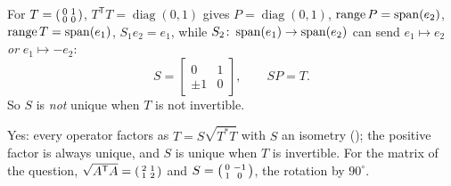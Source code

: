 \documentclass[10pt]{scrartcl}
\begin{document}
\begin{example*}
  For $T=\begin{psmallmatrix}0&1\\0&0\end{psmallmatrix}$, $T^{\mathsf T}T=\operatorname{diag}(0,1)$ gives $P=\operatorname{diag}(0,1)$, $\operatorname{range} P=\operatorname{span}(e_2)$, $\operatorname{range} T=\operatorname{span}(e_1)$, $S_1e_2=e_1$, while $S_2\colon\operatorname{span}(e_1)\to\operatorname{span}(e_2)$ can send $e_1\mapsto e_2$ \emph{or} $e_1\mapsto -e_2$:
  \[
    S=\begin{bmatrix}0&1\\\pm1&0\end{bmatrix}, \qquad SP=T.
  \]
  So $S$ is \emph{not} unique when $T$ is not invertible.
\end{example*}

\revisit Yes: every operator factors as $T=S\sqrt{T^*T}$ with $S$ an isometry (); the positive factor is always unique, and $S$ is unique when $T$ is invertible. For the matrix of the question, $\sqrt{A^{\mathsf T}A}=\begin{psmallmatrix}2&1\\1&2\end{psmallmatrix}$ and $S=\begin{psmallmatrix}0&-1\\1&0\end{psmallmatrix}$, the rotation by $90^\circ$.
\end{document}
